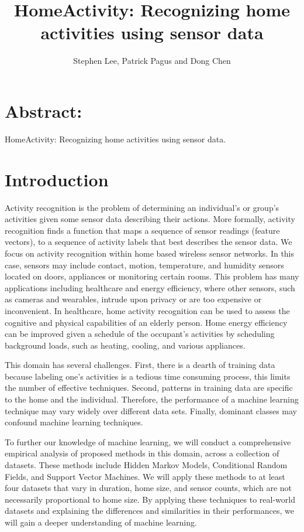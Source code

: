 \documentclass[11pt, oneside]{article}   	%
\title{HomeActivity: Recognizing home activities using sensor data}
\author{Stephen Lee, Patrick Pagus and Dong Chen}
\begin{document}
\maketitle
\section{Abstract:}
HomeActivity: Recognizing home activities using sensor data. 

\section{Introduction}
Activity recognition is the problem of determining an individual's or group's activities given some sensor data describing their actions.
	More formally, activity recognition finds a function that maps a sequence of sensor readings (feature vectors), to a sequence of activity labels that best describes the sensor data.
	We focus on activity recognition within home based wireless sensor networks.
	In this case, sensors may include contact, motion, temperature, and humidity sensors located on doors, appliances or monitoring certain rooms.
	This problem has many applications including healthcare and energy efficiency, where other sensors, such as cameras and wearables, intrude upon privacy or are too expensive or inconvenient.
	In healthcare, home activity recognition can be used to assess the cognitive and physical capabilities of an elderly person.
	Home energy efficiency can be improved given a schedule of the occupant's activities by scheduling background loads, such as heating, cooling, and various appliances.

	This domain has several challenges.
	First, there is a dearth of training data because labeling one's activities is a tedious time consuming process, this limits the number of effective techniques.
	Second, patterns in training data are specific to the home and the individual.
	Therefore, the performance of a machine learning technique may vary widely over different data sets.
	Finally, dominant classes may confound machine learning techniques.

	To further our knowledge of machine learning, we will conduct a comprehensive empirical analysis of proposed methods in this domain, across a collection of datasets.
	These methods include Hidden Markov Models, Conditional Random Fields, and Support Vector Machines.
	We will apply these methods to at least four datasets that vary in duration, home size, and sensor counts, which are not necessarily proportional to home size.
	By applying these techniques to real-world datasets and explaining the differences and similarities in their performances, we will gain a deeper understanding of machine learning.
\end{document}
